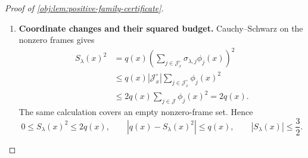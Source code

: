 \begin{proof}[Proof of \cref{obj:lem:positive-family-certificate}]
\begin{enumerate}
For two sign vectors, define the overlap integrand and its integral by
\[
\begin{aligned}
\mathcal H_{\lambda,\lambda'}(x)
={}&t\bigl(1+(tq(x)-1)^2\bigr)S_\lambda(x)S_{\lambda'}(x)\\
&+t^2\bigl(q(x)-S_\lambda(x)^2\bigr)
       \bigl(q(x)-S_{\lambda'}(x)^2\bigr),
\qquad x\in[0,1],\\
H_{\lambda,\lambda'}&=\int_0^1
                         \mathcal H_{\lambda,\lambda'}(x)\,dx.
\end{aligned}
\]
Expanding the four fair mark cells cancels every product of distinct
members of \(1,U,V_Y,UV_Y\), and gives
\begin{equation}
\label{eq:positive-family-fair-mark-identity}
\frac14\sum_{U\in\{-1,1\}}\sum_{V_Y\in\{-1,1\}}
 L_\lambda(x,U,V_Y)L_{\lambda'}(x,U,V_Y)
=1+\mathcal H_{\lambda,\lambda'}(x).
\end{equation}
Each summand lies in \([0,16]\), so
\[
-1\le\mathcal H_{\lambda,\lambda'}(x)\le15,
\qquad
-1\le H_{\lambda,\lambda'}\le15,
\qquad
|H_{\lambda,\lambda'}|\le15.
\]
All the displayed functions are measurable and bounded.

For fixed \(\lambda'\), the sign moments established above imply
\[
\begin{aligned}
E_\lambda\mathcal H_{\lambda,\lambda'}(x)
={}&t\bigl(1+(tq(x)-1)^2\bigr)
       S_{\lambda'}(x)E_\lambda S_\lambda(x)\\
&+t^2\bigl(q(x)-E_\lambda S_\lambda(x)^2\bigr)
       \bigl(q(x)-S_{\lambda'}(x)^2\bigr)
=0.
\end{aligned}
\]
Commuting the finite sign average with the integral gives
\[
E_\lambda H_{\lambda,\lambda'}=0.
\]

\item \textbf{Coordinate changes and their squared budget.}
Cauchy--Schwarz on the nonzero frames gives
\[
\begin{aligned}
S_\lambda(x)^2
&=q(x)\left(
  \sum_{j\in\mathcal J_x^\circ}\sigma_{\lambda,j}\phi_j(x)
       \right)^2\\
&\le q(x)|\mathcal J_x^\circ|
               \sum_{j\in\mathcal J_x^\circ}\phi_j(x)^2\\
&\le2q(x)\sum_{j\in\mathcal J}\phi_j(x)^2
=2q(x).
\end{aligned}
\]
The same calculation covers an empty nonzero-frame set. Hence
\[
0\le S_\lambda(x)^2\le2q(x),
\qquad
|q(x)-S_\lambda(x)^2|\le q(x),
\qquad
|S_\lambda(x)|\le\frac32.
\]


\end{enumerate}
\end{proof}
